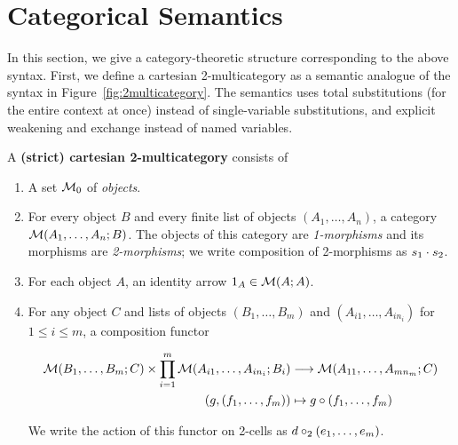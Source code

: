 \newcommand\cD{\ensuremath{\mathcal{D}}}

\section{Categorical Semantics}

In this section, we give a category-theoretic structure corresponding to
the above syntax.  First, we define a cartesian 2-multicategory as a
semantic analogue of the syntax in Figure~\ref{fig:2multicategory}. The
semantics uses total substitutions (for the entire context at once)
instead of single-variable substitutions, and explicit weakening and
exchange instead of named variables.

\begin{definition}
  A \textbf{(strict) cartesian 2-multicategory} consists of
  \begin{enumerate}
  \item A set $\mathcal{M}_0$ of \emph{objects}.
  \item For every object $B$ and every finite list of objects $(A_1,\dots,A_n)$, a category $\mathcal{M}(A_1,\dots,A_n;B)$.
    The objects of this category are \emph{1-morphisms} and its morphisms are \emph{2-morphisms}; we write composition of 2-morphisms as $s_1 \cdot s_2$.
  \item For each object $A$, an identity arrow $1_A\in\mathcal{M}(A;A)$.
  \item For any object $C$ and lists of objects $(B_1,\dots,B_m)$ and $(A_{i1},\dots,A_{in_i})$ for $1\le i\le m$, a composition functor
    \begin{footnotesize}
    \begin{align*}
      \mathcal{M}(B_1,\dots,B_m;C) \times \prod_{i=1}^m \mathcal{M}(A_{i1},\dots,A_{in_i};B_i) &\longrightarrow \mathcal{M}(A_{11},\dots,A_{mn_m};C)\\
      (g,(f_1,\dots,f_m)) &\mapsto g\circ (f_1,\dots,f_m)
    \end{align*}
    \end{footnotesize}
    We write the action of this functor on 2-cells as $d \mathbin{\circ_2} (e_1,\dots,e_m)$.

\end{enumerate}
\end{definition}
